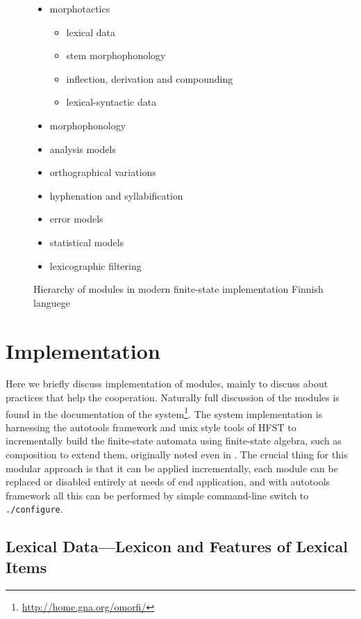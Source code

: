 \documentclass[postprint]{flammie}
\begin{document}
\begin{figure}[h]
\begin{centering}
\caption{Hierarchy of modules in modern finite-state implementation Finnish languege
\label{fig:modules}}
\end{centering}
\begin{scriptsize}
\begin{itemize}
\item morphotactics \begin{itemize}
    \item lexical data
    \item stem morphophonology
    \item inflection, derivation and compounding
    \item lexical-syntactic data
\end{itemize}
\item morphophonology
\item analysis models
\item orthographical variations
\item hyphenation and syllabification
\item error models
\item statistical models
\item lexicographic filtering
\end{itemize}
\end{scriptsize}
\end{figure}

\section{Implementation}
\label{sec:implementation}

Here we briefly discuss implementation of modules, mainly to discuss
about practices that help the cooperation. Naturally full discussion of the
modules is found in the documentation of the
system\footnote{\url{http://home.gna.org/omorfi/}}. The system
implementation is harnessing the autotools framework and unix style tools of
HFST to incrementally build the finite-state automata using finite-state
algebra, such as composition to extend them, originally noted even in
\cite{beesley/2003}. The crucial thing for this modular approach is that it
can be applied incrementally, each module can be replaced or disabled entirely
at needs of end application, and with autotools framework all this
can be performed by simple command-line switch to \verb|./configure|.

\subsection{Lexical Data---Lexicon and Features of Lexical Items}
\end{document}
